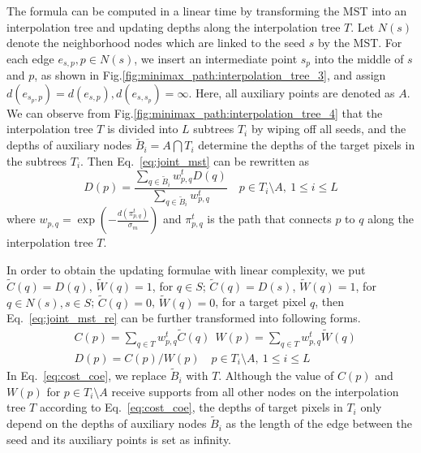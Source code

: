 \documentclass[preprint,10pt,5p,times,twocolumn]{elsarticle}
\begin{document}
The formula can be computed in a linear time by transforming the MST into an interpolation tree and updating depths along the interpolation tree $T$. Let $N(s)$ denote the neighborhood nodes which are linked to the seed $s$ by the MST. For each edge $e_{s, p}, p \in N(s)$, we insert an intermediate point $s_p$ into the middle of $s$ and $p$, as shown in Fig.\ref{fig:minimax_path:interpolation_tree_3}, and assign $d(e_{s_p, p}) = d(e_{s, p}), d(e_{s, s_p}) = \infty$. Here, all auxiliary points are denoted as $A$. We can observe from Fig.\ref{fig:minimax_path:interpolation_tree_4} that the interpolation tree $T$ is divided into $L$ subtrees $T_i$ by wiping off all seeds, and the depths of auxiliary nodes $\widetilde{B}_i = A \bigcap T_i$ determine the depths of the target pixels in the subtrees $T_i$. Then Eq.~\eqref{eq:joint_mst} can be rewritten as
%
\begin{equation}
D(p) = \frac{ \sum\nolimits_{q \in \widetilde{B}_i} {w^t_{p,q}D(q)} }{ {\sum\nolimits_{q \in \widetilde{B}_i} {w^t_{p,q}}}} \quad p \in T_i \setminus A, \ 1 \leq i \leq L \label{eq:joint_mst_re}
\end{equation}
%
where $w_{p,q} = \exp( - \frac{{d}(\pi^t_{{p},{q}})}{\sigma_m})$ and $\pi^t_{{p},{q}}$ is the path that connects $p$ to $q$ along the interpolation tree $T$.


In order to obtain the updating formulae with linear complexity, we put
$\widetilde C(q) = D(q)$, $\widetilde W(q) = 1$, for $q \in S$; $\widetilde C(q) = D(s)$, $\widetilde W(q) = 1$, for $q \in N(s), s \in S$; $\widetilde C(q) = 0$, $\widetilde W(q) = 0$, for a target pixel $q$, then Eq.~\eqref{eq:joint_mst_re} can be further transformed into following forms.
%
\begin{align}
&C(p) = \sum\nolimits_{q \in T} {w^t_{p,q} \widetilde C(q)} \ \ W(p) = \sum\nolimits_{q \in T} {w^t_{p,q} \widetilde W(q)} \label{eq:cost_coe} \\
&D(p) = C(p)/ W(p) \quad p \in T_i \setminus A, \ 1 \leq i \leq L \label{eq:depth}
\end{align}
%
In Eq.~\eqref{eq:cost_coe}, we replace $\widetilde{B}_i$ with $T$. Although the value of $C(p)$ and $W(p)$ for $p \in  T_i \setminus A$ receive supports from all other nodes on the interpolation tree $T$ according to Eq.~\eqref{eq:cost_coe}, the depths of target pixels in $T_i$ only depend on the depths of auxiliary nodes $\widetilde{B}_i$ as the length of the edge between the seed and its auxiliary points is set as infinity.
\end{document}
